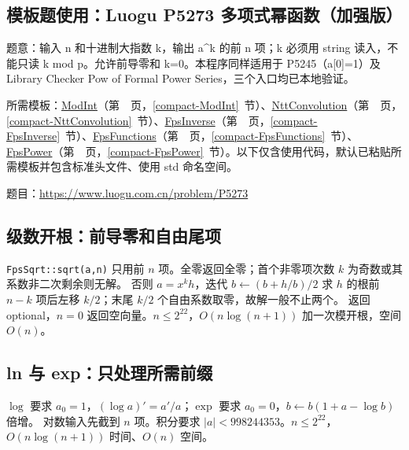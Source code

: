 

\Needspace{387pt}

\subsection*{模板题使用：Luogu P5273 多项式幂函数（加强版）}

\label{usage-example-120}

题意：输入 n 和十进制大指数 k，输出 a\textasciicircum{}k 的前 n 项；k 必须用 string 读入，不能只读 k mod p。允许前导零和 k=0。本程序同样适用于 P5245（a[0]=1）及 Library Checker Pow of Formal Power Series，三个入口均已本地验证。

所需模板：\hyperref[compact-ModInt]{ModInt}（第~\pageref{compact-ModInt}~页，\ref{compact-ModInt}~节）、\hyperref[compact-NttConvolution]{NttConvolution}（第~\pageref{compact-NttConvolution}~页，\ref{compact-NttConvolution}~节）、\hyperref[compact-FpsInverse]{FpsInverse}（第~\pageref{compact-FpsInverse}~页，\ref{compact-FpsInverse}~节）、\hyperref[compact-FpsFunctions]{FpsFunctions}（第~\pageref{compact-FpsFunctions}~页，\ref{compact-FpsFunctions}~节）、\hyperref[compact-FpsPower]{FpsPower}（第~\pageref{compact-FpsPower}~页，\ref{compact-FpsPower}~节）。以下仅含使用代码，默认已粘贴所需模板并包含标准头文件、使用 std 命名空间。

题目：\url{https://www.luogu.com.cn/problem/P5273}



\subsection{级数开根：前导零和自由尾项}\label{knowledge-poly-sqrt}
\texttt{FpsSqrt::sqrt(a,n)} 只用前 $n$ 项。全零返回全零；首个非零项次数 $k$ 为奇数或其系数非二次剩余则无解。
否则 $a=x^kh$，迭代 $b\gets(b+h/b)/2$ 求 $h$ 的根前 $n-k$ 项后左移 $k/2$；末尾 $k/2$ 个自由系数取零，故解一般不止两个。
返回 optional，$n=0$ 返回空向量。$n\le2^{22}$，$O(n\log(n+1))$ 加一次模开根，空间 $O(n)$。


\subsection{ln 与 exp：只处理所需前缀}\label{knowledge-poly-ln-exp}
$\log$ 要求 $a_0=1$，$(\log a)'=a'/a$；$\exp$ 要求 $a_0=0$，$b\gets b(1+a-\log b)$ 倍增。
对数输入先截到 $n$ 项。积分要求 $|a|<998244353$。$n\le2^{22}$，$O(n\log(n+1))$ 时间、$O(n)$ 空间。


